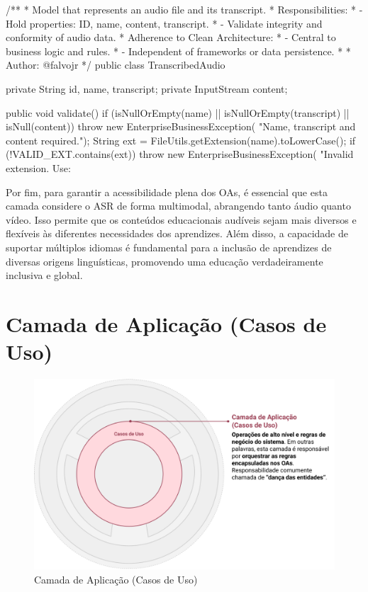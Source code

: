 \begin{codigo}[caption={Exemplo Camada de Entidades: Disponível em \url{https://bit.ly/S2L-Entity}}, label={codigo:exemplo-camada1}, language=Java, breaklines=true]
/**
 * Model that represents an audio file and its transcript.
 * Responsibilities:
 * - Hold properties: ID, name, content, transcript.
 * - Validate integrity and conformity of audio data.
 * Adherence to Clean Architecture:
 * - Central to business logic and rules.
 * - Independent of frameworks or data persistence.
 * 
 * Author: @falvojr
 */
public class TranscribedAudio {
  private String id, name, transcript;
  private InputStream content;

  public void validate() {
    if (isNullOrEmpty(name) || 
      isNullOrEmpty(transcript) || isNull(content)) {
      throw new EnterpriseBusinessException(
        "Name, transcript and content required.");
    }
    String ext = FileUtils.getExtension(name).toLowerCase();
    if (!VALID_EXT.contains(ext)) {
      throw new EnterpriseBusinessException(
        "Invalid extension. Use: %
    }
  }
}
\end{codigo}

Por fim, para garantir a acessibilidade plena dos OAs, é essencial que esta camada considere o ASR de forma multimodal, abrangendo tanto áudio quanto vídeo. Isso permite que os conteúdos educacionais audíveis sejam mais diversos e flexíveis às diferentes necessidades dos aprendizes. Além disso, a capacidade de suportar múltiplos idiomas é fundamental para a inclusão de aprendizes de diversas origens linguísticas, promovendo uma educação verdadeiramente inclusiva e global.

\section{Camada de Aplicação (Casos de Uso)}

\begin{figure}[htb]
\centering
\caption{Camada de Aplicação (Casos de Uso)}
\label{fig:chapter3-speech2learning-layer2}
\includegraphics[width=1\textwidth]{images/chapter3-speech2learning-layer2.png}
\end{figure}

